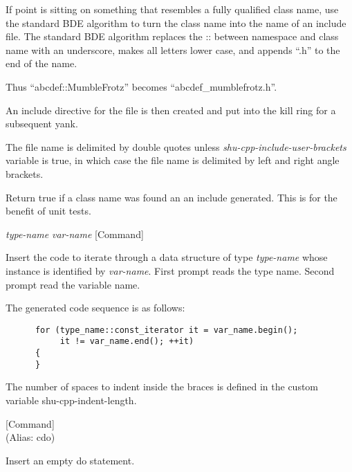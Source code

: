 \begin{doc-string}
If point is sitting on something that resembles a fully qualified class name,
use the standard BDE algorithm to turn the class name into the name of an
include file.  The standard BDE algorithm replaces the :: between namespace and
class name with an underscore, makes all letters lower case, and appends ``.h''
to the end of the name.

Thus ``abcdef::MumbleFrotz'' becomes ``abcdef\_mumblefrotz.h''.

An include directive for the file is then created and put into the kill ring for
a subsequent yank.

The file name is delimited by double quotes unless \emph{shu-cpp-include-user-brackets}
variable is true, in which case the file name is delimited by left and right
angle brackets.

Return true if a class name was found an an include generated.  This is for the
benefit of unit tests.
\end{doc-string}

\vspace{1em}
\noindent
{}
\usebox{\funcname}\emph{type-name} \emph{var-name}
 \hfill [Command]

\begin{doc-string}
Insert the code to iterate through a data structure of type \emph{type-name} whose
instance is identified by \emph{var-name}.  First prompt reads the type name.  Second
prompt read the variable name.

The generated code sequence is as follows:

\small{\begin{verbatim}
      for (type_name::const_iterator it = var_name.begin();
           it != var_name.end(); ++it)
      {
      }
\end{verbatim}}

The number of spaces to indent inside the braces is defined in the custom
variable shu-cpp-indent-length.
\end{doc-string}

\vspace{1em}
\noindent
{}
\usebox{\funcname}
 \hfill [Command]\\%
 (Alias: cdo)

\begin{doc-string}
Insert an empty do statement.
\end{doc-string}

